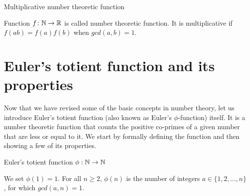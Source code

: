 \documentclass{article}
\begin{document}
\begin{definition}
Multiplicative number theoretic function

Function $f\colon \mathbb{N} \rightarrow \mathbb{R}$ is called number theoretic function. It is multiplicative if $f(ab) = f(a)f(b)$ when $gcd(a, b)=1$.

\end{definition}

\section{Euler's totient function and its properties}

Now that we have revised some of the basic concepts in number theory, let us introduce Euler's totient function (also known as Euler's $\phi$-function) itself. It is a number theoretic function that counts the positive co-primes of a given number that are less or equal to it. We start by formally defining the function and then showing a few of its properties.

\begin{definition}
Euler's totient function $\phi: \mathbb{N} \rightarrow \mathbb{N}$

We set $\phi(1) = 1$. For all $n \geq 2$, $\phi(n)$ is the number of integers $a \in \{1,2,\dots,n\}$, for which $gcd(a,n) = 1$.

\end{definition}

\end{document}
